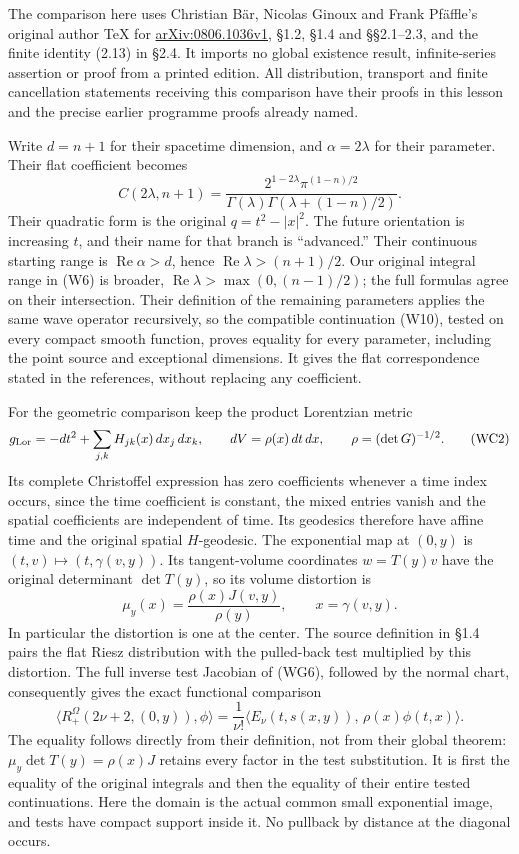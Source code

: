 \documentclass[
  11pt,
]{article}
\begin{document}
The comparison here uses Christian Bär, Nicolas Ginoux and Frank
Pfäffle's original author TeX for
\href{https://arxiv.org/abs/0806.1036v1}{arXiv:0806.1036v1}, §1.2, §1.4
and §§2.1--2.3, and the finite identity (2.13) in §2.4. It imports no
global existence result, infinite-series assertion or proof from a
printed edition. All distribution, transport and finite cancellation
statements receiving this comparison have their proofs in this lesson
and the precise earlier programme proofs already named.

Write \(d=n+1\) for their spacetime dimension, and \(\alpha=2\lambda\)
for their parameter. Their flat coefficient becomes \[
 C(2\lambda,n+1)
  =\frac{2^{1-2\lambda}\pi^{(1-n)/2}}
          {\Gamma(\lambda)\Gamma(\lambda+(1-n)/2)}.
 \tag{WC1}
\] Their quadratic form is the original \(q=t^2-|x|^2\). The future
orientation is increasing \(t\), and their name for that branch is
``advanced.'' Their continuous starting range is
\( \operatorname{Re}\alpha>d\), hence
\(\operatorname{Re}\lambda>(n+1)/2\). Our original integral range in
(W6) is broader, \(\operatorname{Re}\lambda>\max(0,(n-1)/2)\); the full
formulas agree on their intersection. Their definition of the remaining
parameters applies the same wave operator recursively, so the compatible
continuation (W10), tested on every compact smooth function, proves
equality for every parameter, including the point source and exceptional
dimensions. It gives the flat correspondence stated in the references,
without replacing any coefficient.

For the geometric comparison keep the product Lorentzian metric \[
 g_{\rm Lor}=-dt^2+\sum_{j,k}H_{jk}(x)\,dx_j\,dx_k,\qquad
 dV=\rho(x)\,dt\,dx,\qquad \rho=(\det G)^{-1/2}.
 \tag{WC2}
\] Its complete Christoffel expression has zero coefficients whenever a
time index occurs, since the time coefficient is constant, the mixed
entries vanish and the spatial coefficients are independent of time. Its
geodesics therefore have affine time and the original spatial
\(H\)-geodesic. The exponential map at \((0,y)\) is
\((t,v)\mapsto(t,\gamma(v,y))\). Its tangent-volume coordinates
\(w=T(y)v\) have the original determinant \(\det T(y)\), so its volume
distortion is \[
 \mu_y(x)=\frac{\rho(x)J(v,y)}{\rho(y)},\qquad
 x=\gamma(v,y).
 \tag{WC3}
\] In particular the distortion is one at the center. The source
definition in §1.4 pairs the flat Riesz distribution with the
pulled-back test multiplied by this distortion. The full inverse test
Jacobian of (WG6), followed by the normal chart, consequently gives the
exact functional comparison \[
 \big\langle R_+^\Omega(2\nu+2,(0,y)),\phi\big\rangle
     =\frac1{\nu!}\big\langle
              E_\nu(t,s(x,y)),\,\rho(x)\phi(t,x)\big\rangle .
 \tag{WC4}
\] The equality follows directly from their definition, not from their
global theorem: \(\mu_y\det T(y)=\rho(x)J\) retains every factor in the
test substitution. It is first the equality of the original integrals
and then the equality of their entire tested continuations. Here the
domain is the actual common small exponential image, and tests have
compact support inside it. No pullback by distance at the diagonal
occurs.
\end{document}
